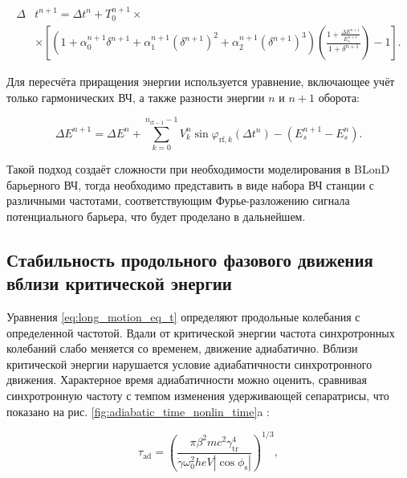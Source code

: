 \begin{equation} \label{eq:blond_dt_exact}
\begin{aligned}
 \Delta & t^{n+1}=\Delta t^n+T_0^{n+1}\times\\
& \times \left[\left(1+\alpha_0^{n+1} \delta^{n+1}+\alpha_1^{n+1}\left(\delta^{n+1}\right)^2+
\alpha_2^{n+1}\left(\delta^{n+1}\right)^3\right)\left(\frac{1+\frac{\Delta E^{n+1}}{E_s^{n+1}}}{1+\delta^{n+1}}\right)-1\right].
\end{aligned}
\end{equation}

\noindent Для пересчёта приращения энергии используется уравнение, включающее учёт только гармонических ВЧ, а также разности энергии $n$ и $n+1$ оборота:

\begin{equation} \label{eq:blond_dE}
\Delta E^{n+1}=\Delta E^n+\sum_{k=0}^{n_{\mathrm{rf}-1}-1} V_k^n \sin \varphi_{\mathrm{rf}, k}\left(\Delta t^n\right)-\left(E_s^{n+1}-E_s^n\right).
\end{equation}

\noindent Такой подход создаёт сложности при необходимости моделирования в BLonD барьерного ВЧ, тогда необходимо представить в виде набора ВЧ станции с различными частотами, соответствующим Фурье-разложению сигнала потенциального барьера, что будет проделано в дальнейшем.
	
	\subsection{Стабильность продольного фазового движения вблизи критической энергии}\label{sec:transition_jump/adiabaticity}
	
\par Уравнения \ref{eq:long_motion_eq_t} определяют продольные колебания с определенной частотой. Вдали от критической энергии частота синхротронных колебаний слабо меняется со временем, движение адиабатично. Вблизи критической энергии нарушается условие адиабатичности синхротронного движения. Характерное время адиабатичности можно оценить, сравнивая синхротронную частоту с темпом изменения удерживающей сепаратрисы, что показано на рис. \ref{fig:adiabatic_time_nonlin_time}a \cite{ng}:

\begin{equation}
\tau_{\textrm{ad}}=\left(\frac{\pi\beta^2mc^2\gamma_{\textrm{tr}}^4}{\dot{\gamma}\omega_0^2heV\left|\cos{\phi_{\textrm{s}}}\right|}\right)^{1/3},
\label{eq:adiabaticity}
\end{equation}

